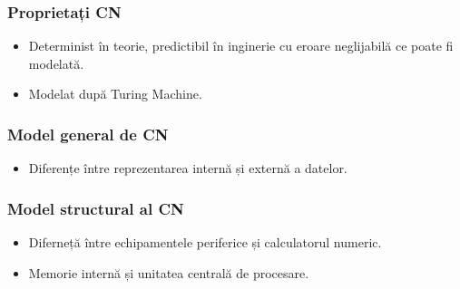 \begin{frame}
    \frametitle{Proprietați CN}
\begin{itemize}
    \item Determinist în teorie, predictibil în inginerie cu eroare neglijabilă ce poate fi modelată.
    \item Modelat după Turing Machine.
\end{itemize}

\end{frame}

\begin{frame}
    \frametitle{Model general de CN}
    \begin{lrbox}{\asciigcn}
        \begin{varwidth}{\maxdimen}
        \end{varwidth}
    \end{lrbox}%

    \begin{figure}[h]
        \centering
        \scalebox{0.9}{\usebox{\asciigcn}}
    \end{figure}

    \begin{itemize}
        \item Diferențe între reprezentarea internă și externă a datelor.
    \end{itemize}
\end{frame}


\begin{frame}
    \frametitle{Model structural al CN}
    \newsavebox{\asciimscn}
    \begin{lrbox}{\asciimscn}
        \begin{varwidth}{\maxdimen}
        \end{varwidth}
    \end{lrbox}%

    \begin{figure}[h]
        \centering
        \scalebox{0.8}{\usebox{\asciimscn}}
    \end{figure}
    \begin{itemize}
        \item Diferneță între echipamentele periferice și calculatorul numeric.
        \item Memorie internă și unitatea centrală de procesare.
    \end{itemize}
\end{frame}


